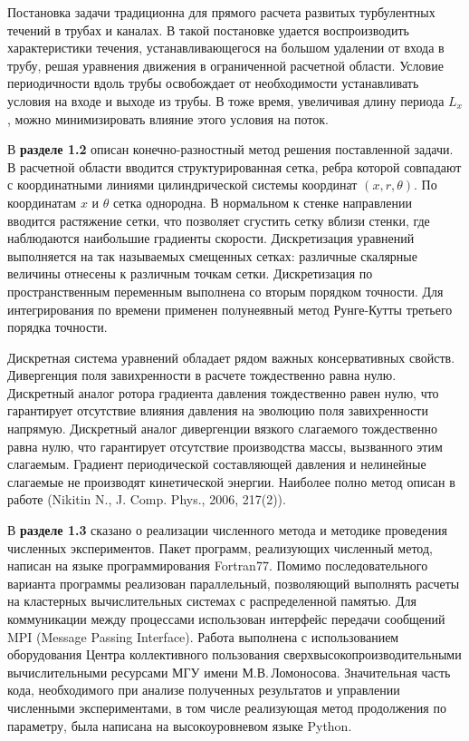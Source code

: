 Постановка задачи традиционна для прямого расчета развитых турбулентных течений в трубах и каналах. В такой постановке удается воспроизводить характеристики течения, устанавливающегося на большом удалении от входа в трубу, решая уравнения движения в ограниченной расчетной области. Условие периодичности вдоль трубы освобождает от необходимости устанавливать условия на входе и выходе из трубы. В тоже время, увеличивая длину периода $L_x$, можно минимизировать влияние этого условия на поток.

В \textbf{разделе 1.2} описан конечно-разностный метод решения поставленной задачи. В расчетной области вводится структурированная сетка, ребра которой совпадают с координатными линиями цилиндрической системы координат $(x,r,\theta)$. По координатам $x$ и $\theta$ сетка однородна. В нормальном к стенке направлении вводится растяжение сетки, что позволяет сгустить сетку вблизи стенки, где наблюдаются наибольшие градиенты скорости. Дискретизация уравнений выполняется на так называемых смещенных сетках: различные скалярные величины отнесены к различным точкам сетки. Дискретизация по пространственным переменным выполнена со вторым порядком точности. Для интегрирования по времени применен полунеявный метод Рунге-Кутты третьего порядка точности. 

Дискретная система уравнений обладает рядом важных консервативных свойств. Дивергенция поля завихренности в расчете тождественно равна нулю. Дискретный аналог ротора градиента давления тождественно равен нулю, что гарантирует отсутствие влияния давления на эволюцию поля завихренности напрямую. Дискретный аналог дивергенции вязкого слагаемого тождественно равна нулю, что гарантирует отсутствие производства массы, вызванного этим слагаемым. Градиент периодической составляющей давления и нелинейные слагаемые не производят кинетической энергии. 
Наиболее полно метод описан в работе (Nikitin N., J. Comp. Phys., 2006, 217(2)).

В \textbf{разделе 1.3} сказано о реализации численного метода и методике проведения численных экспериментов. Пакет программ, реализующих численный метод, написан на языке программирования Fortran77. Помимо последовательного варианта программы реализован параллельный, позволяющий выполнять расчеты на кластерных вычислительных системах с распределенной памятью. Для коммуникации между процессами использован интерфейс передачи сообщений MPI (Message Passing Interface). Работа выполнена с использованием оборудования Центра коллективного пользования сверхвысокопроизводительными вычислительными ресурсами МГУ имени М.В.\,Ломоносова. Значительная часть кода, необходимого при анализе полученных результатов и управлении численными экспериментами, в том числе реализующая метод продолжения по параметру, была написана на высокоуровневом языке Python. 


